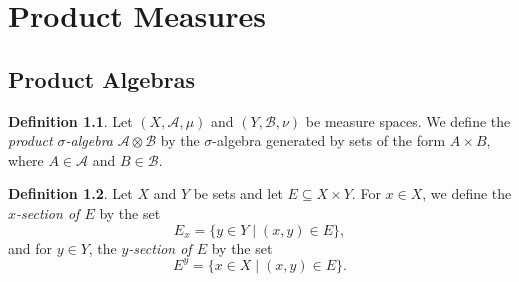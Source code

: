 \documentclass[a4paper, openany]{memoir}
\theoremstyle{definition}
\newtheorem{definition}{Definition}[section]
\theoremstyle{plain}
\begin{document}
    \chapter{Product Measures}
    \section{Product Algebras}
    \begin{definition}
        Let $(X, \mathcal{A}, \mu)$ and $(Y, \mathcal{B}, \nu)$ be measure spaces. We define the \emph{product $\sigma$-algebra} $\mathcal{A} \otimes \mathcal{B}$ by the $\sigma$-algebra generated by sets of the form $A \times B$, where $A \in \mathcal{A}$ and $B \in \mathcal{B}$.
    \end{definition}

    \begin{definition}
        Let $X$ and $Y$ be sets and let $E \subseteq X \times Y$. For $x \in X$, we define the \emph{$x$-section of $E$} by the set
        \[E_x = \{y \in Y \mid (x, y) \in E\},\]
        and for $y \in Y$, the \emph{$y$-section of $E$} by the set
        \[E^y = \{x \in X \mid (x, y) \in E\}.\]
    \end{definition}
\end{document}
